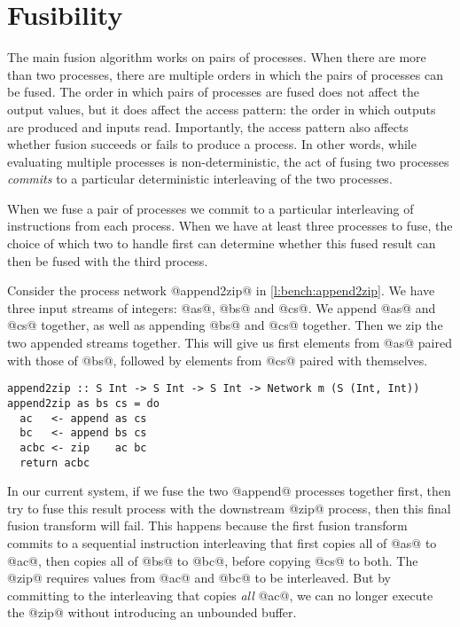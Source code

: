 \section{Fusibility}
\label{s:FusionOrder}

The main fusion algorithm works on pairs of processes.
When there are more than two processes, there are multiple orders in which the pairs of processes can be fused.
The order in which pairs of processes are fused does not affect the output values, but it does affect the access pattern: the order in which outputs are produced and inputs read.
Importantly, the access pattern also affects whether fusion succeeds or fails to produce a process.
In other words, while evaluating multiple processes is non-deterministic, the act of fusing two processes \emph{commits} to a particular deterministic interleaving of the two processes.

When we fuse a pair of processes we commit to a particular interleaving of instructions from each process.
When we have at least three processes to fuse, the choice of which two to handle first can determine whether this fused result can then be fused with the third process.

Consider the process network @append2zip@ in \autoref{l:bench:append2zip}.
We have three input streams of integers: @as@, @bs@ and @cs@.
We append @as@ and @cs@ together, as well as appending @bs@ and @cs@ together.
Then we zip the two appended streams together.
This will give us first elements from @as@ paired with those of @bs@, followed by elements from @cs@ paired with themselves.

\begin{lstlisting}[float,label=l:bench:append2zip,caption=append2zip; S stands for Stream]
append2zip :: S Int -> S Int -> S Int -> Network m (S (Int, Int))
append2zip as bs cs = do
  ac   <- append as cs
  bc   <- append bs cs
  acbc <- zip    ac bc
  return acbc
\end{lstlisting}

In our current system, if we fuse the two @append@ processes together first, then try to fuse this result process with the downstream @zip@ process, then this final fusion transform will fail.
This happens because the first fusion transform commits to a sequential instruction interleaving that first copies all of @as@ to @ac@, then copies all of @bs@ to @bc@, before copying @cs@ to both.
The @zip@ requires values from @ac@ and @bc@ to be interleaved.
But by committing to the interleaving that copies \emph{all} @ac@, we can no longer execute the @zip@ without introducing an unbounded buffer.


